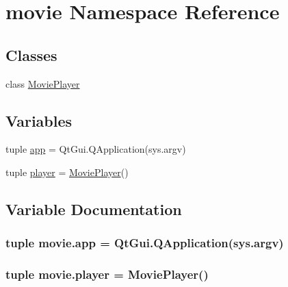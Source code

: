 \hypertarget{namespacemovie}{}\section{movie Namespace Reference}
\label{namespacemovie}
\subsection*{Classes}
\begin{DoxyCompactItemize}
\item 
class \hyperlink{classmovie_1_1MoviePlayer}{Movie\+Player}
\end{DoxyCompactItemize}
\subsection*{Variables}
\begin{DoxyCompactItemize}
\item 
tuple \hyperlink{namespacemovie_a5fe162523f4d488ad0bd5e267e9539f5}{app} = Qt\+Gui.\+Q\+Application(sys.\+argv)
\item 
tuple \hyperlink{namespacemovie_a90f1cfa42d075cb124295b971030f08b}{player} = \hyperlink{classmovie_1_1MoviePlayer}{Movie\+Player}()
\end{DoxyCompactItemize}


\subsection{Variable Documentation}
\hypertarget{namespacemovie_a5fe162523f4d488ad0bd5e267e9539f5}{}
\subsubsection[{app}]{\setlength{\rightskip}{0pt plus 5cm}tuple movie.\+app = Qt\+Gui.\+Q\+Application(sys.\+argv)}\label{namespacemovie_a5fe162523f4d488ad0bd5e267e9539f5}
\hypertarget{namespacemovie_a90f1cfa42d075cb124295b971030f08b}{}
\subsubsection[{player}]{\setlength{\rightskip}{0pt plus 5cm}tuple movie.\+player = {\bf Movie\+Player}()}\label{namespacemovie_a90f1cfa42d075cb124295b971030f08b}
